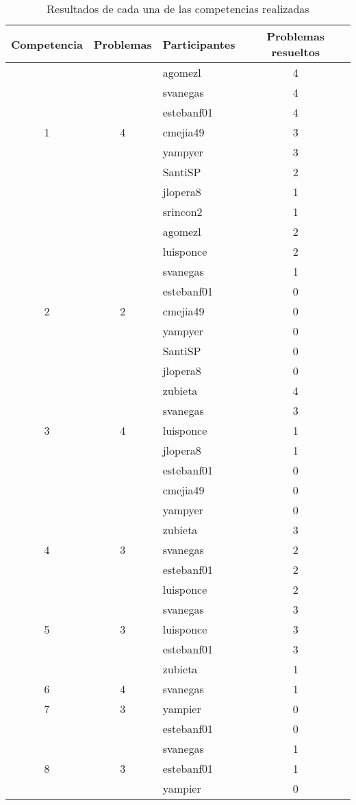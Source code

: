 \documentclass[conference]{IEEEtran}
\begin{document}
\begin{table}
	\centering
	\begin{tabular}{|c|c|l|c|}
		\hline
		Competencia & Problemas & Participantes & Problemas resueltos \\
		\hline
		  &   & agomezl  & 4\\
		  &   & svanegas & 4\\
		  &   & estebanf01 & 4\\
		1 & 4 & cmejia49 & 3\\
		  &   & yampyer & 3\\
		  &   & SantiSP & 2\\
		  &   & jlopera8 & 1\\
		  &   & srincon2 & 1\\
		\hline
		  &   & agomezl  & 2\\
		  &   & luisponce & 2\\
		  &   & svanegas & 1\\
		  &   & estebanf01 & 0\\
		2 & 2 & cmejia49 & 0\\
		  &   & yampyer & 0\\
		  &   & SantiSP & 0\\
		  &   & jlopera8 & 0\\
		\hline
		  &   & zubieta  & 4\\
		  &   & svanegas & 3\\
		3 & 4 & luisponce & 1\\
		  &   & jlopera8 & 1\\
		  &   & estebanf01 & 0\\
		  &   & cmejia49 & 0\\
		  &   & yampyer & 0\\
		\hline
		  &   & zubieta  & 3\\
		4 & 3 & svanegas & 2\\
		  &   & estebanf01 & 2\\
		  &   & luisponce & 2\\
		\hline 
		  &   & svanegas  & 3\\
		5 & 3 & luisponce & 3\\
		  &   & estebanf01 & 3\\
		  &   & zubieta & 1\\
		\hline
		6 & 4 & svanegas & 1 \\
		\hline
		7 & 3 & yampier & 0\\
		  &   & estebanf01 & 0\\
		\hline
		  &   & svanegas & 1\\
		8 & 3 & estebanf01 & 1\\
		  &   & yampier & 0\\
		\hline
		
		
	\end{tabular}
	\caption{Resultados de cada una de las competencias realizadas}
	\label{Tabla:competencias}
\end{table}
\end{document}
